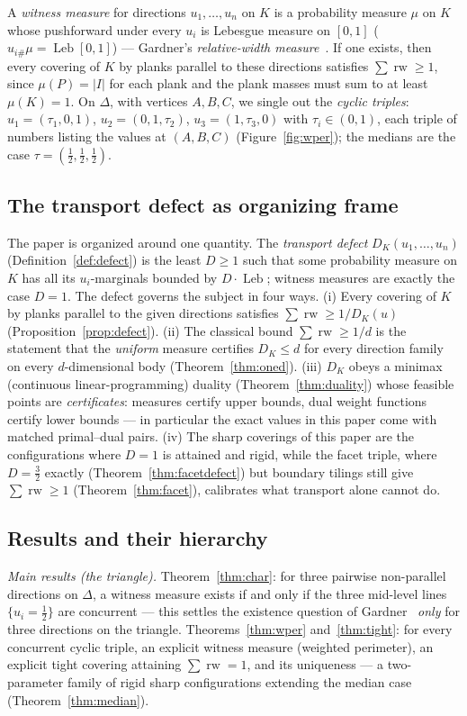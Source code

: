 \documentclass[11pt,reqno]{amsart}
\theoremstyle{plain}
\theoremstyle{definition}
\theoremstyle{remark}
\newcommand{\rw}{\operatorname{rw}}
\newcommand{\Leb}{\operatorname{Leb}}
\begin{document}
A \emph{witness measure} for directions $u_1,\dots,u_n$ on $K$ is a probability
measure $\mu$ on $K$ whose pushforward under every $u_i$ is Lebesgue measure on
$[0,1]$ ($u_{i\#}\mu=\Leb[0,1]$) --- Gardner's \emph{relative-width
measure}~\cite{Gardner88}. If one exists, then every covering of $K$ by planks
parallel to these directions satisfies $\sum\rw\ge1$, since $\mu(P)=|I|$ for
each plank and the plank masses must sum to at least $\mu(K)=1$.
On $\Delta$, with vertices $A,B,C$, we single out the \emph{cyclic triples}:
$u_1=(\tau_1,0,1)$, $u_2=(0,1,\tau_2)$, $u_3=(1,\tau_3,0)$ with
$\tau_i\in(0,1)$, each triple of numbers listing the values at $(A,B,C)$
(Figure~\ref{fig:wper}); the medians are the case
$\tau=(\tfrac12,\tfrac12,\tfrac12)$.

\subsection*{The transport defect as organizing frame}
The paper is organized around one quantity. The \emph{transport defect}
$D_K(u_1,\dots,u_n)$ (Definition~\ref{def:defect}) is the least $D\ge1$ such
that some probability measure on $K$ has all its $u_i$-marginals bounded by
$D\cdot\Leb$; witness measures are exactly the case $D=1$. The defect governs
the subject in four ways. (i) Every covering of $K$ by planks parallel to the
given directions satisfies $\sum\rw\ge1/D_K(u)$
(Proposition~\ref{prop:defect}). (ii) The classical bound $\sum\rw\ge1/d$ is
the statement that the \emph{uniform} measure certifies $D_K\le d$ for every
direction family on every $d$-dimensional body (Theorem~\ref{thm:oned}).
(iii) $D_K$ obeys a minimax (continuous linear-programming) duality
(Theorem~\ref{thm:duality}) whose feasible points are \emph{certificates}:
measures certify upper bounds, dual weight functions certify lower bounds ---
in particular the exact values in this paper come with matched primal--dual
pairs. (iv) The sharp coverings of this paper are the configurations where
$D=1$ is attained and rigid, while the facet triple, where
$D=\tfrac32$ exactly (Theorem~\ref{thm:facetdefect}) but boundary tilings
still give $\sum\rw\ge1$ (Theorem~\ref{thm:facet}), calibrates what transport
alone cannot do.

\subsection*{Results and their hierarchy}
\emph{Main results (the triangle).} Theorem~\ref{thm:char}: for three pairwise
non-parallel directions on $\Delta$, a witness measure exists if and only if
the three mid-level lines $\{u_i=\tfrac12\}$ are concurrent --- this settles
the existence question of Gardner~\cite{Gardner88} \emph{only} for three
directions on the triangle. Theorems~\ref{thm:wper} and~\ref{thm:tight}: for
every concurrent cyclic triple, an explicit witness measure (weighted
perimeter), an explicit tight covering attaining $\sum\rw=1$, and its
uniqueness --- a two-parameter family of rigid sharp configurations extending
the median case (Theorem~\ref{thm:median}).
\end{document}
